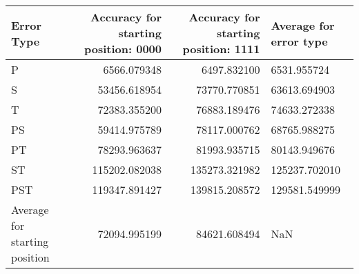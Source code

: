 \begin{tabular}{lrrl}
\toprule
Error Type & Accuracy for starting position: 0000 & Accuracy for starting position: 1111 & Average for error type \\
\midrule
P & 6566.079348 & 6497.832100 & 6531.955724 \\
S & 53456.618954 & 73770.770851 & 63613.694903 \\
T & 72383.355200 & 76883.189476 & 74633.272338 \\
PS & 59414.975789 & 78117.000762 & 68765.988275 \\
PT & 78293.963637 & 81993.935715 & 80143.949676 \\
ST & 115202.082038 & 135273.321982 & 125237.702010 \\
PST & 119347.891427 & 139815.208572 & 129581.549999 \\
\bottomrule
Average for starting position & 72094.995199 & 84621.608494 & NaN \\
\end{tabular}
